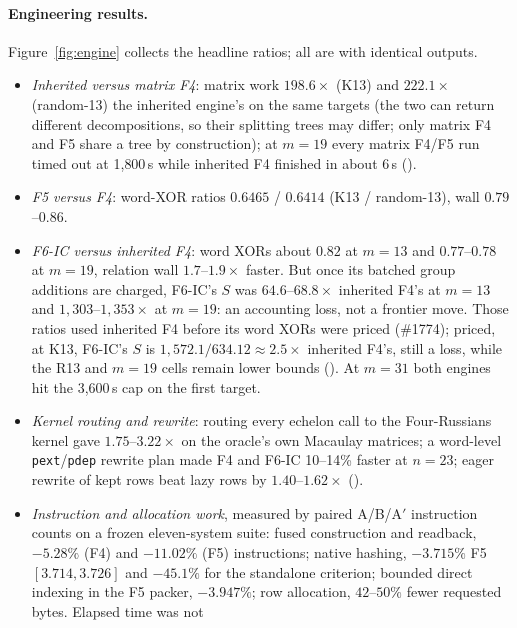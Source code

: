 \paragraph{Engineering results.} Figure~\ref{fig:engine} collects the
headline ratios; all are  with identical outputs.
\begin{itemize}
\item \emph{Inherited versus matrix F4}: matrix work $198.6\times$ (K13)
  and $222.1\times$ (random-13) the inherited engine's on the same targets (the two can return
  different decompositions, so their splitting trees may differ; only
  matrix F4 and F5 share a tree by construction);
  at $m=19$ every matrix F4/F5 run timed out at 1{,}800\,s while
  inherited F4 finished in about 6\,s
  ().
\item \emph{F5 versus F4}: word-XOR ratios $0.6465$ / $0.6414$ (K13 /
  random-13), wall $0.79$--$0.86$.
\item \emph{F6-IC versus inherited F4}: word XORs about $0.82$ at $m=13$
  and $0.77$--$0.78$ at $m=19$, relation wall $1.7$--$1.9\times$ faster.
  But once its batched group additions are charged, F6-IC's $S$ was
  $64.6$--$68.8\times$ inherited F4's at $m=13$ and
  $1{,}303$--$1{,}353\times$ at $m=19$: an accounting loss, not a frontier
  move. Those ratios used inherited F4 before its word XORs were priced
  (\#1774); priced, at K13, F6-IC's $S$ is $1{,}572.1/634.12\approx2.5\times$
  inherited F4's, still a loss, while the R13 and $m=19$ cells remain lower
  bounds (). At $m=31$ both engines hit the 3{,}600\,s cap on the first target.
\item \emph{Kernel routing and rewrite}: routing every echelon call to the
  Four-Russians kernel gave $1.75$--$3.22\times$ on the oracle's own
  Macaulay matrices; a word-level \texttt{pext}/\texttt{pdep} rewrite plan
  made F4 and F6-IC 10--14\% faster at $n=23$; eager rewrite of kept rows
  beat lazy rows by $1.40$--$1.62\times$
  ().
\item \emph{Instruction and allocation work}, measured by paired A/B/A$'$
  instruction counts on a frozen eleven-system suite: fused construction
  and readback, $-5.28\%$ (F4) and $-11.02\%$ (F5) instructions; native
  hashing, $-3.715\%$ F5 $[3.714,3.726]$ and $-45.1\%$ for the standalone
  criterion; bounded direct indexing in the F5 packer, $-3.947\%$; row
  allocation, $42$--$50\%$ fewer requested bytes. Elapsed time was not

\end{itemize}

